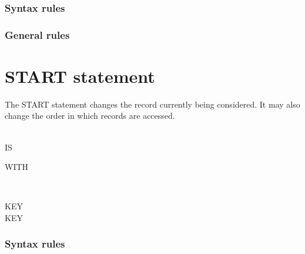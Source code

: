 \subsubsection{Syntax rules}

\subsubsection{General rules}

\section{START statement}

The START statement changes the record currently being considered. It may also change the order in which records are accessed.

\begin{syntax}
   \filename
  \begin{0-1}
     \\

     IS  \identifier \\

  \end{0-1}

  \begin{0-1}
    WITH
    \begin{1=}
       \\
    \end{1=}
    \arithmeticexpression
  \end{0-1}

  \begin{0+}
     KEY \imperativestatement \\
      KEY \imperativestatement
  \end{0+}

  \begin{0-1}
  \end{0-1}
\end{syntax}

\begin{syntax}[\miscextcolour]
\end{syntax}

\subsubsection{Syntax rules}

